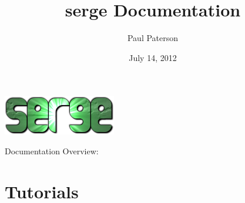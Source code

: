 \documentclass[letterpaper,10pt,english]{sphinxmanual}
\title{serge Documentation}
\date{July 14, 2012}
\author{Paul Paterson}
\begin{document}
\maketitle
\tableofcontents
{}\label{index::doc}
{\hfill\includegraphics{logo.png}}



Documentation Overview:


\chapter{Tutorials}
\label{tutorial:tutorials}\label{tutorial:serge-engine-documentation}\label{tutorial::doc}
\end{document}
